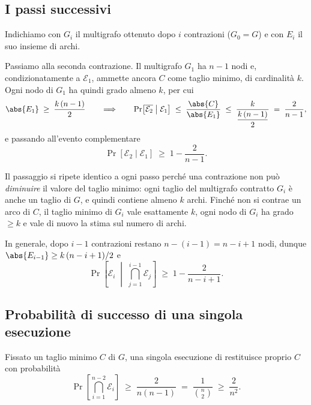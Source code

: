 \subsection{I passi successivi}

Indichiamo con $G_i$ il multigrafo ottenuto dopo $i$ contrazioni ($G_0=G$) e con $E_i$ il suo
insieme di archi.

Passiamo alla seconda contrazione. Il multigrafo $G_1$ ha $n-1$ nodi e, condizionatamente a
$\mathcal{E}_1$, ammette ancora $C$ come taglio minimo, di cardinalità $k$. Ogni nodo di
$G_1$ ha quindi grado almeno $k$, per cui
\[
  \abs{E_1}\;\ge\;\frac{k\,(n-1)}{2}
  \qquad\Longrightarrow\qquad
  \Pr\!\left[\overline{\mathcal{E}_2}\;\middle|\;\mathcal{E}_1\right]
  \;\le\;\frac{\abs{C}}{\abs{E_1}}
  \;\le\;\frac{k}{\dfrac{k\,(n-1)}{2}}
  \;=\;\frac{2}{n-1},
\]
e passando all'evento complementare
\[
  \Pr[\mathcal{E}_2\mid\mathcal{E}_1]\;\ge\;1-\frac{2}{n-1}.
\]

\begin{osservazione}
Il passaggio si ripete identico a ogni passo perché una contrazione non può \emph{diminuire}
il valore del taglio minimo: ogni taglio del multigrafo contratto $G_i$ è anche un taglio di
$G$, e quindi contiene almeno $k$ archi. Finché non si contrae un arco di $C$, il taglio
minimo di $G_i$ vale esattamente $k$, ogni nodo di $G_i$ ha grado $\ge k$ e vale di nuovo la
stima sul numero di archi.
\end{osservazione}

In generale, dopo $i-1$ contrazioni restano $n-(i-1)=n-i+1$ nodi, dunque
$\abs{E_{i-1}}\ge k\,(n-i+1)/2$ e
\[
  \Pr\!\left[\mathcal{E}_i \;\middle|\; \bigcap_{j=1}^{i-1}\mathcal{E}_j\right]
  \;\ge\; 1-\frac{2}{n-i+1}.
\]

\subsection{Probabilità di successo di una singola esecuzione}

\begin{teorema}[Karger]\label{thm:karger}
Fissato un taglio minimo $C$ di $G$, una singola esecuzione di \contract restituisce
proprio $C$ con probabilità
\[
  \Pr\!\left[\bigcap_{i=1}^{n-2}\mathcal{E}_i\right]
  \;\ge\; \frac{2}{n(n-1)} \;=\; \frac{1}{\binom{n}{2}} \;\ge\; \frac{2}{n^{2}} .
\]
\end{teorema}


